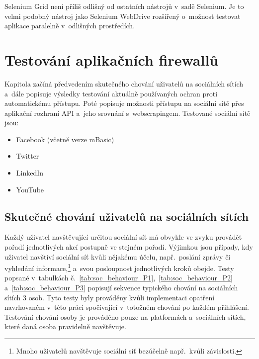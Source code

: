 Selenium Grid není příliš odlišný od ostatních nástrojů v~sadě Selenium. Je to velmi podobný nástroj jako Selenium WebDrive rozšířený o~možnost testovat aplikace paralelně v~odlišných prostředích.

\chapter{Testování aplikačních firewallů}
\label{chap:app_firewalls_tests}
Kapitola začíná předvedením skutečného chování uživatelů na sociálních sítích a~dále popisuje výsledky testování aktuálně používaných ochran proti automatickému přístupu. Poté popisuje možnosti přístupu na sociální sítě přes aplikační rozhraní API a~jeho srovnání s~webscrapingem. Testované sociální sítě jsou:

\begin{itemize}
  \item Facebook (včetně verze mBasic)
  \item Twitter
  \item LinkedIn
  \item YouTube
\end{itemize}

\section{Skutečné chování uživatelů na sociálních sítích}
Každý uživatel navštěvující určitou sociální síť má obvykle ve zvyku provádět pořadí jednotlivých akcí postupně ve stejném pořadí. Výjimkou jsou případy, kdy uživatel navštíví sociální síť kvůli nějakému účelu, např.~poslání zprávy či vyhledání informace,\footnote{Mnoho uživatelů navštěvuje sociální síť bezúčelně např.~kvůli závislosti.} a~svou posloupnost jednotlivých kroků obejde. Testy popsané v~tabulkách č.~\ref{tab:soc_behaviour_P1},~\ref{tab:soc_behaviour_P2} a~\ref{tab:soc_behaviour_P3} popisují sekvence typického chování na sociálních sítích 3 osob. Tyto testy byly prováděny kvůli implementaci opatření navrhovaném v~této práci spočívající v~totožném chování po každém přihlášení. Testování chování osoby je prováděno pouze na platformách a~sociálních sítích, které daná osoba pravidelně navštěvuje.

